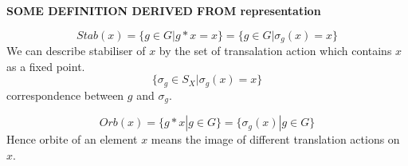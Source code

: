 \documentclass[en,geye,blue,normal,12pt]{elegantnote}
\begin{document}
\textbf{SOME DEFINITION DERIVED FROM representation}

\[Stab(x) = \{g \in G| g*x = x\} = \{g \in G| \sigma_g(x) = x\}\]
We can describe stabiliser of \(x\) by the set of transalation action which contains \(x\) as a fixed point.
\[\{\sigma_g \in S_X | \sigma_g(x) = x\}\]
correspondence between \(g\) and \(\sigma_g\).

\[Orb(x) = \{g*x| g \in G\} = \{\sigma_g(x)|g \in G\}
\] Hence orbite of an element \(x\) means the image of different translation actions on \(x\).
\end{document}
